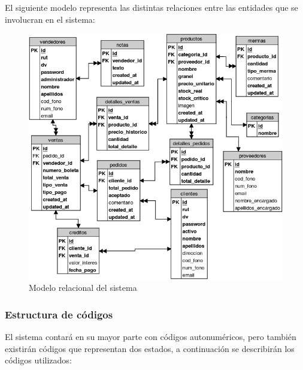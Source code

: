\documentclass[letterpaper,12pt]{article}
\begin{document}
El siguiente modelo representa las distintas relaciones entre las entidades que se involucran en el sistema:
\mbox{}
\\\vspace*{0.2cm}
\begin{figure}[!ht]
\begin{center}      
\includegraphics[width =1.0\textwidth]{images/modelo_relacional.png}
\end{center}
\caption{Modelo relacional del sistema}
\end{figure}

\newpage

\subsubsection{Estructura de códigos}

El sistema contará en su mayor parte con códigos autonuméricos, pero también existirán 
códigos que representan dos estados, a continuación se describirán los códigos utilizados:
\end{document}
